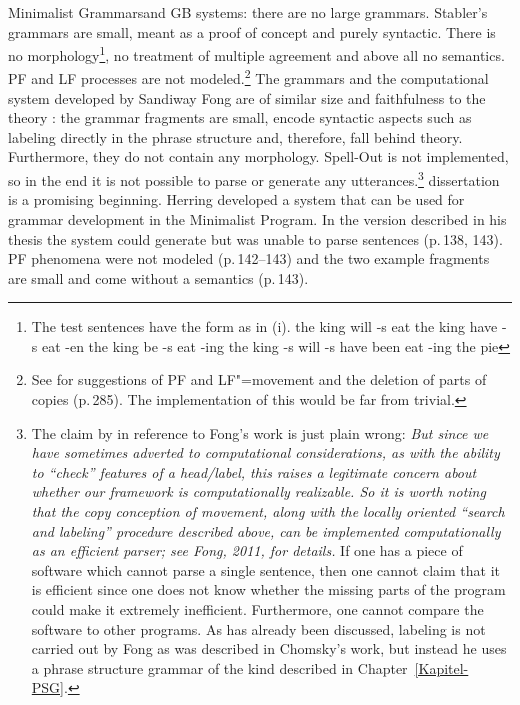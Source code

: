 Minimalist Grammars\indexmg and GB systems: there are no large grammars. Stabler's grammars are small, meant as a proof of concept and purely
syntactic. There is no morphology\footnote{%
	The test sentences have the form as in (i).
\eal
\ex the king will -s eat
\ex the king have -s eat -en
\ex the king be -s eat -ing
\ex the king -s will -s have been eat -ing the pie\vspace{-\baselineskip}%
\zllast%
}, no treatment of multiple agreement \citep[Section~27.4.3]{Stabler2010b} and above all no semantics. PF and LF
processes are not modeled.\footnote{%
	See \citet{SE2002a} for suggestions of PF and LF"=movement and the deletion of parts of copies (p.\,285).
	The implementation of this would be far from trivial.
} 
The grammars and the computational system developed by Sandiway Fong are of similar size and faithfulness
to the theory \citep{FG2012a,Fong2014a}: the grammar fragments are small,
encode syntactic aspects such as labeling directly in the phrase structure \citep[Section~4]{FG2012a} and, therefore, fall behind \xbar theory.
Furthermore, they do not contain any morphology. Spell-Out is not implemented, so in the end it is not possible to parse or generate any 
utterances.\footnote{%
	The claim by \citet*[]{BPYC2011a} in reference to Fong's work is just plain wrong: \emph{But since we have
    sometimes adverted to computational considerations, as with the ability to ``check'' features of
    a head/label, this raises a legitimate concern about whether our framework is computationally
    realizable. So it is worth noting that the copy conception of movement, along with the locally
    oriented ``search and labeling'' procedure described above, can be implemented computationally
    as an efficient parser; see Fong, 2011, for details.} If one has a piece of software which cannot
	parse a single sentence, then one cannot claim that it is efficient since one does not know whether the 
	missing parts of the
	program could make it extremely inefficient. Furthermore, one cannot compare the software to other programs.
	As has already been discussed, labeling is not carried out by Fong as was described in
        Chomsky's work, but instead he uses a phrase structure grammar  of the kind described in Chapter~\ref{Kapitel-PSG}.%
}
 dissertation is a promising beginning. Herring developed a system that can be used for grammar development in the Minimalist
Program. In the version described in his thesis the system could generate but was unable to parse
sentences (p.\,138, 143). PF phenomena were not modeled (p.\,142--143) and the two example fragments
are small and come without a semantics (p.\,143).




